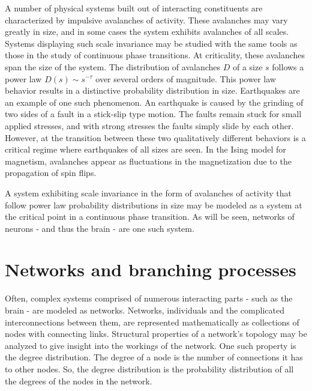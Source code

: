 \documentclass[12pt]{article}
\begin{document}
A number of physical systems built out of interacting constituents are characterized by impulsive avalanches of activity. These avalanches may vary greatly in size, and in some cases the system exhibits avalanches of all scales. Systems displaying such scale invariance may be studied with the same tools as those in the study of continuous phase transitions. At criticality, these avalanches span the size of the system. The distribution of avalanches $D$ of a size $s$ follows a power law $ D(s) \sim s^{-\tau} $ over several orders of magnitude. This power law behavior results in a distinctive probability distribution in size. Earthquakes are an example of one such phenomenon\cite{Sethna2011a}. An earthquake is caused by the grinding of two sides of a fault in a stick-slip type motion. The faults remain stuck for small applied stresses, and with strong stresses the faults simply slide by each other. However, at the transition between these two qualitatively different behaviors is a critical regime where earthquakes of all sizes are seen. In the Ising model for magnetism, avalanches appear as fluctuations in the magnetization due to the propagation of spin flips. 

A system exhibiting scale invariance in the form of avalanches of activity that follow power law probability distributions in size may be modeled as a system at the critical point in a continuous phase transition. As will be seen, networks of neurons - and thus the brain - are one such system.

\section*{Networks and branching processes}

Often, complex systems comprised of numerous interacting parts - such as the brain - are modeled as networks. Networks, individuals and the complicated interconnections between them, are represented mathematically as collections of nodes with connecting links. Structural properties of a network's topology may be analyzed to give insight into the workings of the network. One such property is the degree distribution. The degree of a node is the number of connections it has to other nodes. So, the degree distribution is the probability distribution of all the degrees of the nodes in the network. 
\end{document}
